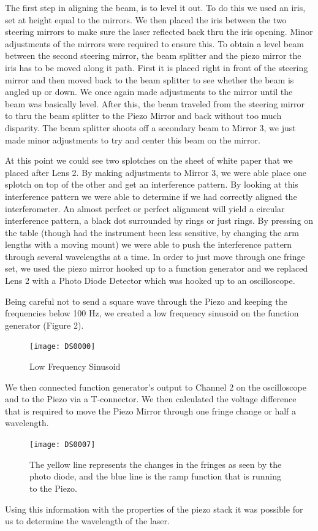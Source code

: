 The first step in aligning the beam, is to level it out. To do this we used an iris, set at height equal to the mirrors. We then placed the iris between the two steering mirrors to make sure the laser reflected back thru the iris opening. Minor adjustments of the mirrors were required to ensure this.  To obtain a level beam between the second steering mirror, the beam splitter and the piezo mirror the iris has to be moved along it path. First it is placed right in front of the steering mirror and then moved back to the beam splitter to see whether the beam is angled up or down. We once again made adjustments to the mirror until the beam was basically level. After this, the beam traveled from the steering mirror to thru the beam splitter to the Piezo Mirror and back without too much disparity. The beam splitter shoots off a secondary beam to Mirror 3, we just made minor adjustments to try and center this beam on the mirror. 

At this point we could see two splotches on the sheet of white paper that we placed after Lens 2. By making adjustments to Mirror 3, we were able place one splotch on top of the other and get an interference pattern. By looking at this interference pattern we were able to determine if we had correctly aligned the interferometer. An almost perfect or perfect alignment will yield a circular interference pattern, a black dot surrounded by rings or just rings. By pressing on the table (though had the instrument been less sensitive, by changing the arm lengths with a moving mount) we were able to push the interference pattern through several wavelengths at a time. In order to just move through one fringe set, we used the piezo mirror hooked up to a function generator and we replaced Lens 2 with a Photo Diode Detector which was hooked up to an oscilloscope.

Being careful not to send a square wave through the Piezo and keeping the frequencies below 100 Hz, we created a low frequency sinusoid on the function generator (Figure 2).

		\begin{figure}[ht!]
		\centering
		\texttt{[image: DS0000]}
		\caption{Low Frequency Sinusoid}
		\end{figure}

We then connected function generator's output to Channel 2 on the oscilloscope and to the Piezo via a T-connector. We then calculated the voltage difference that is required to move the Piezo Mirror through one fringe change or half a wavelength.

		\begin{figure}[ht!]
		\centering
		\texttt{[image: DS0007]}
		\caption{The yellow line represents the changes in the fringes as seen by the photo diode, and the blue line is the ramp function that is running to the Piezo.}
		\end{figure}	
 Using this information with the properties of the piezo stack it was possible for us to determine the wavelength of the laser.